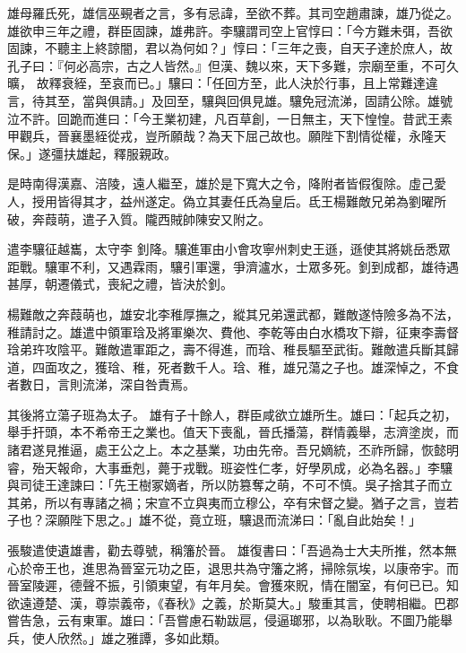 \begin{pinyinscope}
 雄母羅氏死，雄信巫覡者之言，多有忌諱，至欲不葬。其司空趙肅諫，雄乃從之。雄欲申三年之禮，群臣固諫，雄弗許。李驤謂司空上官惇曰：「今方難未弭，吾欲固諫，不聽主上終諒闇，君以為何如？」惇曰：「三年之喪，自天子達於庶人，故孔子曰：『何必高宗，古之人皆然。』但漢、魏以來，天下多難，宗廟至重，不可久曠，
 故釋衰絰，至哀而已。」驤曰：「任回方至，此人決於行事，且上常難達違言，待其至，當與俱請。」及回至，驤與回俱見雄。驤免冠流涕，固請公除。雄號泣不許。回跪而進曰：「今王業初建，凡百草創，一日無主，天下惶惶。昔武王素甲觀兵，晉襄墨絰從戎，豈所願哉？為天下屈己故也。願陛下割情從權，永隆天保。」遂彊扶雄起，釋服親政。



 是時南得漢嘉、涪陵，遠人繼至，雄於是下寬大之令，降附者皆假復除。虛己愛人，授用皆得其才，益州遂定。偽立其妻任氏為皇后。氐王楊難敵兄弟為劉曜所破，奔葭萌，遣子入質。隴西賊帥陳安又附之。



 遣李驤征越巂，太守李
 釗降。驤進軍由小會攻寧州刺史王遜，遜使其將姚岳悉眾距戰。驤軍不利，又遇霖雨，驤引軍還，爭濟瀘水，士眾多死。釗到成都，雄待遇甚厚，朝遷儀式，喪紀之禮，皆決於釗。



 楊難敵之奔葭萌也，雄安北李稚厚撫之，縱其兄弟還武都，難敵遂恃險多為不法，稚請討之。雄遣中領軍琀及將軍樂次、費他、李乾等由白水橋攻下辯，征東李壽督琀弟玝攻陰平。難敵遣軍距之，壽不得進，而琀、稚長驅至武街。難敵遣兵斷其歸道，四面攻之，獲琀、稚，死者數千人。琀、稚，雄兄蕩之子也。雄深悼之，不食者數日，言則流涕，深自咎責焉。



 其後將立蕩子班為太子。
 雄有子十餘人，群臣咸欲立雄所生。雄曰：「起兵之初，舉手扞頭，本不希帝王之業也。值天下喪亂，晉氏播蕩，群情義舉，志濟塗炭，而諸君遂見推逼，處王公之上。本之基業，功由先帝。吾兄嫡統，丕祚所歸，恢懿明睿，殆天報命，大事垂剋，薨于戎戰。班姿性仁孝，好學夙成，必為名器。」李驤與司徒王達諫曰：「先王樹冢嫡者，所以防篡奪之萌，不可不慎。吳子捨其子而立其弟，所以有專諸之禍；宋宣不立與夷而立穆公，卒有宋督之變。猶子之言，豈若子也？深願陛下思之。」雄不從，竟立班，驤退而流涕曰：「亂自此始矣！」



 張駿遣使遺雄書，勸去尊號，稱籓於晉。
 雄復書曰：「吾過為士大夫所推，然本無心於帝王也，進思為晉室元功之臣，退思共為守籓之將，掃除氛埃，以康帝宇。而晉室陵遲，德聲不振，引領東望，有年月矣。會獲來貺，情在闇室，有何已已。知欲遠遵楚、漢，尊崇義帝，《春秋》之義，於斯莫大。」駿重其言，使聘相繼。巴郡嘗告急，云有東軍。雄曰：「吾嘗慮石勒跋扈，侵逼瑯邪，以為耿耿。不圖乃能舉兵，使人欣然。」雄之雅譚，多如此類。




\end{pinyinscope}
